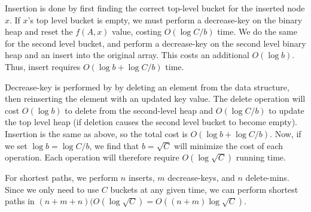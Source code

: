 \documentclass[psamsfonts]{amsart}
\newenvironment{sol}{\vspace{0.25cm}{\large \bfseries Solution:}}{\qedsymbol}
\begin{document}
\begin{sol}
Insertion is done by first finding the correct top-level bucket for the inserted node $x$. If $x$'s top level bucket is empty, we must perform a decrease-key on the binary heap and reset the $f(A,x)$ value, costing $O(\log C/b)$ time. We do the same for the second level bucket, and perform a decrease-key on the second level binary heap and an insert into the original array. This costs an additional $O(\log b)$. Thus, insert requires $O(\log b + \log C/b)$ time.

Decrease-key is performed by by deleting an element from the data structure, then reinserting the element with an updated key value. The delete operation will cost $O(\log b)$ to delete from the second-level heap and $O(\log C/b)$ to update the top level heap (if deletion causes the second level bucket to become empty). Insertion is the same as above, so the total cost is $O(\log b + \log C/b)$. Now, if we set $\log b = \log C/b$, we find that $b = \sqrt{C}$ will minimize the cost of each operation. Each operation will therefore require $O(\log \sqrt{C})$ running time.

For shortest paths, we perform $n$ inserts, $m$ decrease-keys, and $n$ delete-mins. Since we only need to use $C$ buckets at any given time, we can perform shortest paths in $(n + m + n)(O(\log \sqrt{C}) = O((n+m)\log \sqrt{C})$. 
\end{sol}
\end{document}

